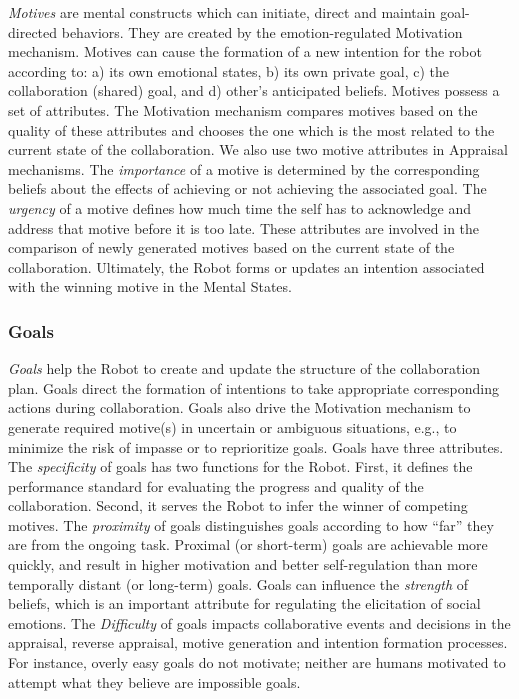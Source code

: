 \textit{Motives} are mental constructs which can initiate, direct and maintain
goal-directed behaviors. They are created by the emotion-regulated Motivation
mechanism. Motives can cause the formation of a new intention for the robot
according to: a) its own emotional states, b) its own private goal, c) the
collaboration (shared) goal, and d) other's anticipated beliefs. Motives possess
a set of attributes. The Motivation mechanism compares motives based on the
quality of these attributes and chooses the one which is the most related to the
current state of the collaboration. We also use two motive attributes in
Appraisal mechanisms. The \textit{importance} of a motive is determined by the
corresponding beliefs about the effects of achieving or not achieving the
associated goal. The \textit{urgency} of a motive defines how much time the self
has to acknowledge and address that motive before it is too late. These
attributes are involved in the comparison of newly generated motives based on
the current state of the collaboration. Ultimately, the Robot forms or updates
an intention associated with the winning motive in the Mental States.

\subsubsection{Goals}
\label{sec:goals}

\textit{Goals} help the Robot to create and update the structure of the
collaboration plan. Goals direct the formation of intentions to take appropriate
corresponding actions during collaboration. Goals also drive the Motivation
mechanism to generate required motive(s) in uncertain or ambiguous situations,
e.g., to minimize the risk of impasse or to reprioritize goals. Goals have
three attributes. The \textit{specificity} of goals has two functions for the
Robot. First, it defines the performance standard for evaluating the progress
and quality of the collaboration. Second, it serves the Robot to infer the
winner of competing motives. The \textit{proximity} of goals distinguishes goals
according to how ``far'' they are from the ongoing task. Proximal (or
short-term) goals are achievable more quickly, and result in higher motivation
and better self-regulation than more temporally distant (or long-term) goals.
Goals can influence the \textit{strength} of beliefs, which is an important
attribute for regulating the elicitation of social emotions. The
\textit{Difficulty} of goals impacts collaborative events and decisions in the
appraisal, reverse appraisal, motive generation and intention formation
processes. For instance, overly easy goals do not motivate; neither are humans
motivated to attempt what they believe are impossible goals.

